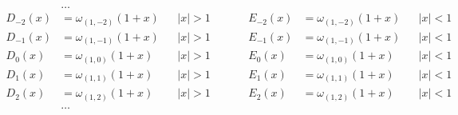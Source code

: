 \begin{equation*} \begin{aligned}
&\ldots \\
D_{-2}(x) &= \omega_{(1,-2)}(1 + x) &
&|x| > 1 &
&\quad &
E_{-2}(x) &= \omega_{(1,-2)}(1 + x) &
&|x| < 1 \\
%
D_{-1}(x) &= \omega_{(1,-1)}(1 + x) &
&|x| > 1 &
&\quad &
E_{-1}(x) &= \omega_{(1,-1)}(1 + x) &
&|x| < 1 \\
%
D_0(x) &= \omega_{(1,0)}(1 + x) &
&|x| > 1 &
&\quad &
E_0(x) &= \omega_{(1,0)}(1 + x) &
&|x| < 1 \\
%
D_1(x) &= \omega_{(1,1)}(1 + x) &
&|x| > 1 &
&\quad &
E_1(x) &= \omega_{(1,1)}(1 + x) &
&|x| < 1 \\
%
D_2(x) &= \omega_{(1,2)}(1 + x) &
&|x| > 1 &
&\quad &
E_2(x) &= \omega_{(1,2)}(1 + x) &
&|x| < 1 \\
%
&\ldots \\
\end{aligned} \end{equation*}

